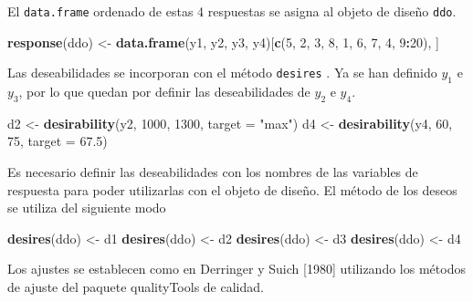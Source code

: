 \documentclass[
]{book}
\newenvironment{Shaded}{\begin{snugshade}}{\end{snugshade}}
\newcommand{\AttributeTok}[1]{\textcolor[rgb]{0.13,0.29,0.53}{#1}}
\newcommand{\DecValTok}[1]{\textcolor[rgb]{0.00,0.00,0.81}{#1}}
\newcommand{\FloatTok}[1]{\textcolor[rgb]{0.00,0.00,0.81}{#1}}
\newcommand{\FunctionTok}[1]{\textcolor[rgb]{0.13,0.29,0.53}{\textbf{#1}}}
\newcommand{\NormalTok}[1]{#1}
\newcommand{\OtherTok}[1]{\textcolor[rgb]{0.56,0.35,0.01}{#1}}
\newcommand{\SpecialCharTok}[1]{\textcolor[rgb]{0.81,0.36,0.00}{\textbf{#1}}}
\newcommand{\StringTok}[1]{\textcolor[rgb]{0.31,0.60,0.02}{#1}}
\begin{document}
El \texttt{data.frame} ordenado de estas 4 respuestas se asigna al objeto de diseño \texttt{ddo}.

\begin{Shaded}
\begin{Highlighting}[]
\FunctionTok{response}\NormalTok{(ddo) }\OtherTok{\textless{}{-}} \FunctionTok{data.frame}\NormalTok{(y1, y2, y3, y4)[}\FunctionTok{c}\NormalTok{(}\DecValTok{5}\NormalTok{, }\DecValTok{2}\NormalTok{, }\DecValTok{3}\NormalTok{, }\DecValTok{8}\NormalTok{, }\DecValTok{1}\NormalTok{, }\DecValTok{6}\NormalTok{, }\DecValTok{7}\NormalTok{, }\DecValTok{4}\NormalTok{, }\DecValTok{9}\SpecialCharTok{:}\DecValTok{20}\NormalTok{), ]}
\end{Highlighting}
\end{Shaded}

Las deseabilidades se incorporan con el método \texttt{desires} .
Ya se han definido \(y_1\) e \(y_3\), por lo que quedan por definir las deseabilidades de \(y_2\) e \(y_4\).

\begin{Shaded}
\begin{Highlighting}[]
\NormalTok{d2 }\OtherTok{\textless{}{-}} \FunctionTok{desirability}\NormalTok{(y2, }\DecValTok{1000}\NormalTok{, }\DecValTok{1300}\NormalTok{, }\AttributeTok{target =} \StringTok{"max"}\NormalTok{)}
\NormalTok{d4 }\OtherTok{\textless{}{-}} \FunctionTok{desirability}\NormalTok{(y4, }\DecValTok{60}\NormalTok{, }\DecValTok{75}\NormalTok{, }\AttributeTok{target =} \FloatTok{67.5}\NormalTok{)}
\end{Highlighting}
\end{Shaded}

Es necesario definir las deseabilidades con los nombres de las variables de respuesta para poder utilizarlas con el objeto de diseño. El método de los deseos se utiliza del siguiente modo

\begin{Shaded}
\begin{Highlighting}[]
\FunctionTok{desires}\NormalTok{(ddo) }\OtherTok{\textless{}{-}}\NormalTok{ d1}
\FunctionTok{desires}\NormalTok{(ddo) }\OtherTok{\textless{}{-}}\NormalTok{ d2}
\FunctionTok{desires}\NormalTok{(ddo) }\OtherTok{\textless{}{-}}\NormalTok{ d3}
\FunctionTok{desires}\NormalTok{(ddo) }\OtherTok{\textless{}{-}}\NormalTok{ d4}
\end{Highlighting}
\end{Shaded}

Los ajustes se establecen como en Derringer y Suich {[}1980{]} utilizando los métodos de ajuste del paquete qualityTools de calidad.
\end{document}
